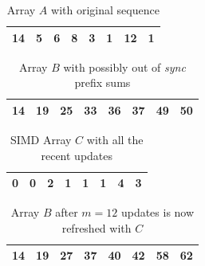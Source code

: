 \begin{table}[H]
\centering
    \begin{tabular}{|c|c|c|c|c|c|c|c|}
            \hline
             14 & 5 & 6 & 8 & 3 & 1 & 12 & 1 \\
            \hline
        \end{tabular}
    \caption{Array $A$ with original sequence}
    \label{tab:array-A-original}
\end{table}
\begin{table}[H]
\centering
    \begin{tabular}{|c|c|c|c|c|c|c|c|}
            \hline
             14 & 19 & 25 & 33 & 36 & 37 & 49 & 50 \\
            \hline
        \end{tabular}
    \caption{Array $B$ with possibly out of \textit{sync} prefix sums}
    \label{tab:array-B-out-of-sync}
\end{table}
\begin{table}[H]
\centering
        \begin{tabular}{|c|c|c|c|c|c|c|c|}
            \hline
            0 & 0 & 2 & 1 & 1& 1& 4 & 3\\
            \hline
        \end{tabular}
    \caption{SIMD Array $C$ with all the recent updates}
    \label{tab:array-C-updates}
\end{table}
\begin{table}[H]
\centering
        \begin{tabular}{|c|c|c|c|c|c|c|c|}
            \hline
            14 & 19 & 27 & 37 & 40& 42& 58 & 62\\
            \hline
        \end{tabular}
    \caption{Array $B$ after $m=12$ updates is now refreshed with $C$}
    \label{tab:array-B-refreshed}
\end{table}

\FloatBarrier
